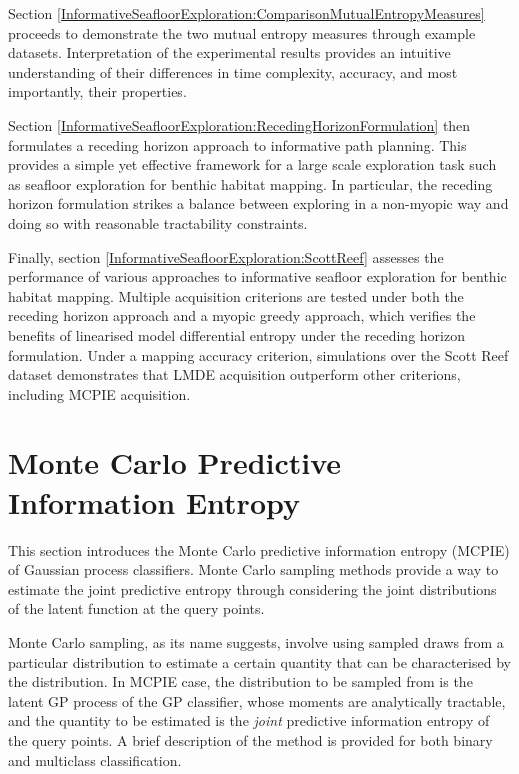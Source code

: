 	Section \ref{InformativeSeafloorExploration:ComparisonMutualEntropyMeasures} proceeds to demonstrate the two mutual entropy measures through example datasets. Interpretation of the experimental results provides an intuitive understanding of their differences in time complexity, accuracy, and most importantly, their properties.
	
	Section \ref{InformativeSeafloorExploration:RecedingHorizonFormulation} then formulates a receding horizon approach to informative path planning. This provides a simple yet effective framework for a large scale exploration task such as seafloor exploration for benthic habitat mapping. In particular, the receding horizon formulation strikes a balance between exploring in a non-myopic way and doing so with reasonable tractability constraints.
	
	Finally, section \ref{InformativeSeafloorExploration:ScottReef} assesses the performance of various approaches to informative seafloor exploration for benthic habitat mapping. Multiple acquisition criterions are tested under both the receding horizon approach and a myopic greedy approach, which verifies the benefits of linearised model differential entropy under the receding horizon formulation. Under a mapping accuracy criterion, simulations over the Scott Reef dataset demonstrates that LMDE acquisition outperform other criterions, including MCPIE acquisition.
		
	\section{Monte Carlo Predictive Information Entropy}
	\label{InformativeSeafloorExploration:MCPIE}
	
		This section introduces the Monte Carlo predictive information entropy (MCPIE) of Gaussian process classifiers. Monte Carlo sampling methods provide a way to estimate the joint predictive entropy through considering the joint distributions of the latent function at the query points.
	
		Monte Carlo sampling, as its name suggests, involve using sampled draws from a particular distribution to estimate a certain quantity that can be characterised by the distribution. In MCPIE case, the distribution to be sampled from is the latent GP process of the GP classifier, whose moments are analytically tractable, and the quantity to be estimated is the \textit{joint} predictive information entropy of the query points. A brief description of the method is provided for both binary and multiclass classification.
		
